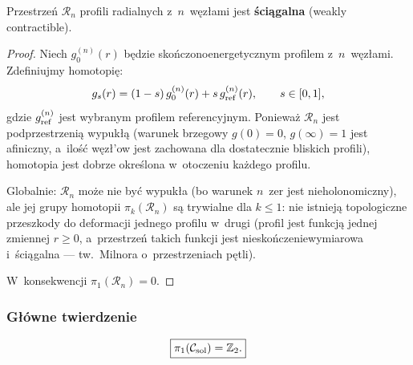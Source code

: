 \begin{lemma}%
\label{lem:R-n-contractible}
Przestrze\'n $\mathcal{R}_n$ profili radialnych z~$n$~w\k{e}z\l{}ami
jest \textbf{\'sci\k{a}galna} (weakly contractible).
\end{lemma}

\begin{proof}
Niech $g_0^{(n)}(r)$ b\k{e}dzie sko\'nczonoenergetycznym profilem
z~$n$~w\k{e}z\l{}ami. Zdefiniujmy homotopi\k{e}:
\begin{equation}
  g_s(r) = (1 - s)\,g_0^{(n)}(r) + s\,g_{\rm ref}^{(n)}(r),
  \qquad s \in [0,1],
\end{equation}
gdzie $g_{\rm ref}^{(n)}$ jest wybranym profilem referencyjnym.
Poniewa\.z $\mathcal{R}_n$ jest podprzestrzeni\k{a} wypuk\l{}\k{a}
(warunek brzegowy $g(0) = 0$, $g(\infty) = 1$ jest afiniczny,
a~ilo\'s\'c w\k{e}z\l{}'ow jest zachowana dla dostatecznie bliskich
profili), homotopia jest dobrze okre\'slona w~otoczeniu ka\.zdego
profilu.

Globalnie: $\mathcal{R}_n$ mo\.ze nie by\'c wypuk\l{}a
(bo warunek $n$~zer jest nieholonomiczny), ale jej
grupy homotopii $\pi_k(\mathcal{R}_n)$ s\k{a} trywialne
dla $k \leq 1$: nie istniej\k{a} topologiczne przeszkody
do deformacji jednego profilu w~drugi
(profil jest funkcj\k{a} jednej zmiennej $r \geq 0$,
a~przestrze\'n takich funkcji jest nieskończeniewymiarowa
i~\'sci\k{a}galna --- tw.\ Milnora o~przestrzeniach
p\k{e}tli).

W~konsekwencji $\pi_1(\mathcal{R}_n) = 0$.
\end{proof}

\subsubsection{G\l{}\'owne twierdzenie}%
\label{sssec:main-theorem-pi1}

\begin{theorem}%
\label{thm:pi1-Z2}
\begin{equation}
  \boxed{
    \pi_1(\mathcal{C}_{\rm sol}) = \mathbb{Z}_2.
  }
\end{equation}
\end{theorem}


